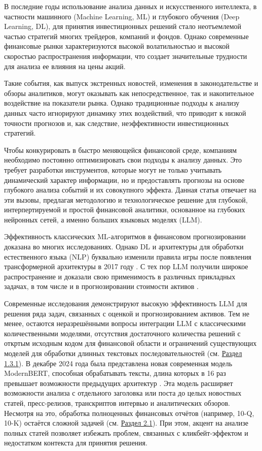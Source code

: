 В последние годы использование анализа данных и искусственного интеллекта, в частности машинного (Machine Learning, ML)
и глубокого обучения (Deep Learning, DL), для принятия инвестиционных решений стало неотъемлемой частью стратегий многих
трейдеров, компаний и фондов. Однако современные финансовые рынки характеризуются высокой волатильностью
и высокой скоростью распространения информации, что создает значительные трудности для анализа ее влияния
на цены акций.

Такие события, как выпуск экстренных новостей, изменения в законодательстве и обзоры аналитиков, могут оказывать
как непосредственное, так и накопительное воздействие на показатели рынка. Однако традиционные подходы к анализу
данных часто игнорируют динамику этих воздействий, что приводит к низкой точности прогнозов и, как следствие,
неэффективности инвестиционных стратегий.

Чтобы конкурировать в быстро меняющейся финансовой среде, компаниям необходимо постоянно оптимизировать свои
подходы к анализу данных. Это требует разработки инструментов, которые могут не только учитывать динамический
характер информации, но и предоставлять прогнозы на основе глубокого анализа событий и их совокупного эффекта.
Данная статья отвечает на эти вызовы, предлагая методологию и технологическое решение для глубокой, интерпертируемой
и простой финансовой аналитики, основанное на глубоких нейронных сетей, а именно больших языковых моделях (LLM).

Эффективность классических ML-алгоритмов в финансовом прогнозировании доказана во многих исследованиях.
Однако DL и архитектуры для обработки естественного языка (NLP) буквально изменили правила игры после появления
трансформерной архитектуры в 2017 году \parencite{vaswani2017attention}. С тех пор LLM получили широкое распространение
и доказали свою применимость в различных прикладных задачах, в том числе и в прогнозировании стоимости активов
\parencite{Jiang2023, Halder2022, Kim2023}.

Современные исследования демонстрируют высокую эффективность LLM для решения ряда задач, связанных с оценкой и
прогнозированием активов. Тем не менее, остаются неразрешёнными вопросы интеграции LLM с классическими количественными
моделями, отсутствия достаточного количества решений с откртым исходным кодом для финансовой области и ограничений
существующих моделей для обработки длинных текстовых последовательностей (см. \hyperref[sec:models]{Раздел 1.3.1}).
В декабре 2024 года была представлена новая современная модель ModernBERT, способная обрабатывать тексты, длина которых
в 16 раз превышает возможности предыдущих архитектур \parencite{Warner2024ModernBERT, devlin2019BERT}. Эта модель
расширяет возможности анализа с отдельного заголовка или поста до целых новостных статей, пресс-релизов, транскриптов
интервью и аналитических обзоров. Несмотря на это, обработка полноценных финансовых отчётов (например, 10-Q, 10-K)
остаётся сложной задачей (см. \hyperref[sec:limitations]{Раздел 2.1}). При этом, акцент на анализе полных статей
позволяет избежать проблем, связанных с кликбейт-эффектом и недостатком контекста для принятия решения.

